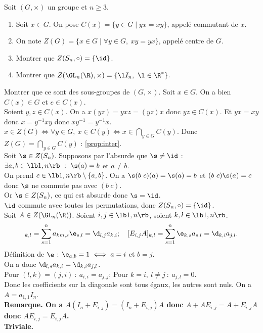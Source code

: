 \documentclass[11pt]{article}
\begin{document}
\begin{exercice}{}{}
    Soit $(G,\times)$ un groupe et $n\geq3$.
    \begin{enumerate}
        \item Soit $x\in G$. On pose $C(x)=\{y\in G \mid yx=xy\}$, appelé commutant de $x$.
        \item On note $Z(G)=\{x\in G \mid \forall y \in G, ~ xy=yx\}$, appelé centre de $G$.
        \item Montrer que $Z(S_n,\circ)=\{\id\}$.
        \item Montrer que $Z(\GL_n(\R),\times)=\{\l I_n, ~ \l \in \R^*\}$.
    \end{enumerate}
    Montrer que ce sont des sous-groupes de $(G,\times)$.
    \tcblower
     Soit $x\in G$. On a bien $C(x)\in G$ et $e\in C(x)$.\\
    Soient $y,z\in C(x)$. On a $x(yz)=yxz=(yz)x$ donc $yz\in C(x)$. Et $yx=xy$ donc $x=y^{-1}xy$ donc $xy^{-1}=y^{-1}x$.\\
     $x\in Z(G)\iff \forall y \in G, ~ x \in C(y) \iff x \in \bigcap_{y\in G}C(y)$. Donc $Z(G)=\bigcap_{y\in G}C(y)$ : \ref{prop:inter}.\\
     Soit $\s\in Z(S_n)$. Supposons par l'absurde que $\s\neq\id$ : $\exists a,b\in\lb1,n\rb ~ : ~ \s(a)=b$ et $a\neq b$.\\
    On prend $c\in\lb1,n\rb\setminus\{a,b\}$. On a $\s(b~c)(a)=\s(a)=b$ et $(b~c)\s(a)=c$ donc $\s$ ne commute pas avec $(b~c)$.\\
    Or $\s\in Z(S_n)$, ce qui est absurde donc $\s=\id$.\\
     $\id$ commute avec toutes les permutations, donc $Z(S_n,\circ)=\{\id\}$.\\
     Soit $A\in Z(\GL_n(\R))$. Soient $i,j\in\lb1,n\rb$, soient $k,l\in\lb1,n\rb$.
    \begin{equation*}
        [AE_{i,j}]_{k,l}=\sum_{s=1}^na_{km,s}\e_{s,l}=\d_{l,j}a_{k,i}; \quad [E_{i,j}A]_{k,l}=\sum_{s=1}^n\e_{k,s}a_{s,l}=\d_{k,i}a_{j,l}.
    \end{equation*}
    Définition de $\e$ : $\e_{a,b}=1\iff a=i$ et $b=j$.\\
    On a donc $\d_{l,s}a_{k,i}=\d_{k,i}a_{j,l}$.\\
    Pour $(l,k)=(j,i) ~:~ a_{i,i}=a_{j,j}$; Pour $k=i, ~ l\neq j ~:~ a_{j,l}=0$.\\
    Donc les coefficients sur la diagonale sont tous égaux, les autres sont nuls. On a $A=a_{1,1}I_n$.\\
    \bf{Remarque.} On a $A(I_n+E_{i,j})=(I_n+E_{i,j})A$ donc $A+AE_{i,j}=A+E_{i,j}A$ donc $AE_{i,j}=E_{i,j}A$.\\
     Triviale.
\end{exercice}
\end{document}
